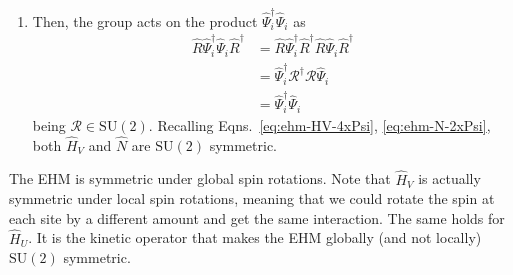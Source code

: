 \begin{enumerate}
\[\begin{aligned}
	\end{aligned}
	\]
	We omitted some purely algebraic passages. The second order:
	\[
		\begin{aligned}
			\comm{
				i \bm{\theta} \cdot \hat{\mathbf{S}}
			}{
				\comm{ i \bm{\theta} \cdot \hat{\mathbf{S}} }{ \hat{\Psi}_i }
			}
			&= \comm{
				i \bm{\theta} \cdot \hat{\mathbf{S}}
			}{
				-\frac{i}{2} (\bm{\theta} \cdot \bm{\tau}) \hat \Psi_i
			} \\
			&= -\frac{i}{2} \bm{\theta} \cdot \bm{\tau} \comm{
				i \bm{\theta} \cdot \hat{\mathbf{S}}
			}{
				\Psi_i
			} \\
			&= \frac{1}{4} (\bm{\theta} \cdot \bm{\tau})^2 \hat{\Psi}_i
		\end{aligned}
	\]
	and so on. Collecting all terms,
	\[
	\begin{aligned}
		\hat R (\bm{\theta}) \hat \Psi_i \hat R (\bm{\theta})^\dagger &= \hat \Psi_i -\frac{i}{2} \bm{\theta} \cdot \bm{\tau} \hat \Psi_i + \frac{1}{2! \times 4} (\bm{\theta} \cdot \bm{\tau})^2 \hat{\Psi}_i + \cdots \\
		&= \sum_{k=1}^\infty \frac{1}{k!} \left( - \frac{i}{2} \bm{\theta} \cdot \bm{\tau} \right)^k \hat \Psi_i \\
		&= \mathcal{R}(\bm{\theta}) \hat \Psi_i
	\end{aligned}
	\]
	In last passage, we identified the series as the Taylor expansion of the exponential, recognising the expression for $\mathcal{R}(\bm{\theta})$ given in Eq.~\eqref{eq:ehm-R-exp}.
	\item Then, the group acts on the product $\hat \Psi_i^\dagger \hat \Psi_i$ as
	\[
		\begin{aligned}
			\hat R \hat \Psi_i^\dagger \hat \Psi_i \hat R^\dagger &= \hat R \hat \Psi_i^\dagger \hat R^\dagger \hat R \hat \Psi_i \hat R^\dagger \\
			&= \hat \Psi_i^\dagger \mathcal{R}^\dagger \mathcal{R} \hat \Psi_i\\
			&= \hat \Psi_i^\dagger \hat \Psi_i
		\end{aligned}
	\]
	being $\mathcal{R} \in \mathrm{SU}(2)$. Recalling Eqns.~\eqref{eq:ehm-HV-4xPsi}, \eqref{eq:ehm-N-2xPsi}, both $\hat H_V$ and $\hat N$ are $\mathrm{SU}(2)$ symmetric.
\end{enumerate}
The EHM is symmetric under global spin rotations. Note that $\hat H_V$ is actually symmetric under local spin rotations, meaning that we could rotate the spin at each site by a different amount and get the same interaction. The same holds for $\hat H_U$. It is the kinetic operator that makes the EHM globally (and not locally) $\mathrm{SU}(2)$ symmetric.

